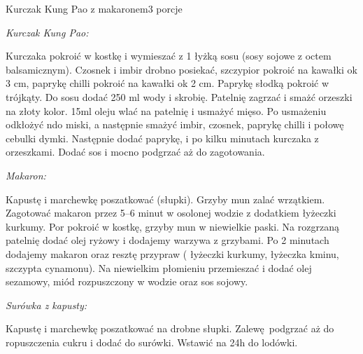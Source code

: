 \documentclass[a4paper,12pt]{article}
\begin{document}
\begin{recipe}{Kurczak Kung Pao z makaronem}{3 porcje}{}
\freeform%
\begin{center}
\textit{Kurczak Kung Pao:}
\end{center}

Kurczaka pokroić w kostkę i wymieszać z 1 łyżką sosu (sosy sojowe z octem balsamicznym). Czosnek i imbir drobno posiekać, szczypior pokroić na kawałki ok 3 cm, paprykę chilli pokroić na kawałki ok 2 cm. 
Paprykę słodką pokroić w trójkąty. Do sosu dodać 250 ml wody i skrobię. Patelnię zagrzać i smażć orzeszki na złoty kolor. 15ml oleju wlać na patelnię i usmażyć mięso.
\freeform%
Po usmażeniu odkłożyć ndo miski, a następnie smażyć imbir, czosnek, paprykę chilli i połowę cebulki dymki. Następnie dodać paprykę, i po kilku minutach kurczaka z orzeszkami. Dodać sos i mocno podgrzać aż do zagotowania.

\begin{center}
\textit{Makaron:}
\end{center}
Kapustę i marchewkę poszatkować (słupki). Grzyby mun zalać wrzątkiem. Zagotować makaron przez 5--6 minut w osolonej wodzie z dodatkiem  łyżeczki kurkumy.
Por pokroić w kostkę, grzyby mun w niewielkie paski. Na rozgrzaną patelnię dodać olej ryżowy i dodajemy warzywa z grzybami.
Po 2 minutach dodajemy makaron oraz resztę przypraw ( łyżeczki kurkumy, łyżeczka kminu, szczypta cynamonu). Na niewielkim płomieniu przemieszać i dodać olej sezamowy, miód rozpuszczony w wodzie oraz sos sojowy.

\newpage

\freeform%
\begin{center}
\textit{Surówka z kapusty:}
\end{center}

Kapustę i marchewkę poszatkować na drobne słupki. Zalewę podgrzać aż do ropuszczenia cukru i dodać do surówki. Wstawić na 24h do lodówki.

\end{recipe}
\end{document}
